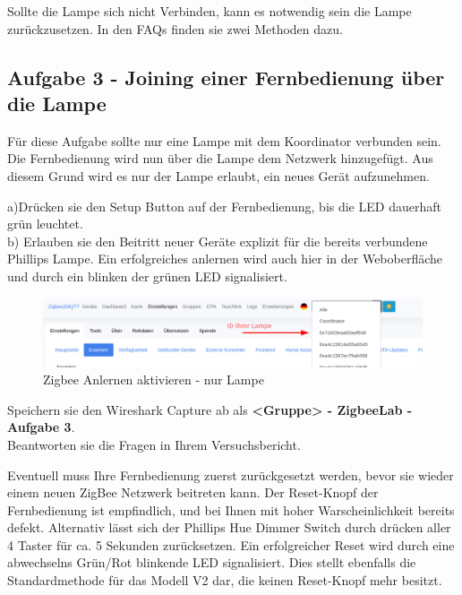 \begin{Hinweis}
Sollte die Lampe sich nicht Verbinden, kann es notwendig sein die Lampe zurückzusetzen. In den FAQs finden sie zwei Methoden dazu.
\end{Hinweis}

\subsection{Aufgabe 3 - Joining einer Fernbedienung über die Lampe}
Für diese Aufgabe sollte nur eine Lampe mit dem Koordinator verbunden sein. Die Fernbedienung wird nun über die Lampe dem Netzwerk hinzugefügt. Aus diesem Grund wird es nur der Lampe
erlaubt, ein neues Gerät aufzunehmen. 

a)Drücken sie den Setup Button auf der Fernbedienung, bis die LED dauerhaft grün leuchtet.  \\
b) Erlauben sie den Beitritt neuer Geräte explizit für die bereits verbundene Phillips Lampe.
Ein erfolgreiches anlernen wird auch hier in der Weboberfläche
und durch ein blinken der grünen LED signalisiert. 


\begin{figure}[H]
    \centering
    \includegraphics[width=1\textwidth]{media/Z2M-Anlernen-Lampe.png}
    \caption{Zigbee Anlernen aktivieren - nur Lampe}
\end{figure}

\begin{Aufgabe}
    Speichern sie den Wireshark Capture ab als \textbf{\grqq <Gruppe> - ZigbeeLab - Aufgabe 3\grqq{}}. \\
    Beantworten sie die Fragen in Ihrem Versuchsbericht.
\end{Aufgabe}

\begin{Hinweis}
    Eventuell muss Ihre Fernbedienung zuerst zurückgesetzt werden, bevor sie wieder einem neuen ZigBee Netzwerk beitreten kann.
    Der Reset-Knopf der Fernbedienung ist empfindlich, und bei Ihnen mit hoher Warscheinlichkeit bereits defekt. Alternativ lässt sich der Phillips Hue
    Dimmer Switch durch drücken aller 4 Taster für ca. 5 Sekunden zurücksetzen. Ein erfolgreicher Reset wird durch eine abwechselns Grün/Rot blinkende LED
    signalisiert. Dies stellt ebenfalls die Standardmethode für das Modell V2 dar, die keinen Reset-Knopf mehr besitzt.
\end{Hinweis}

